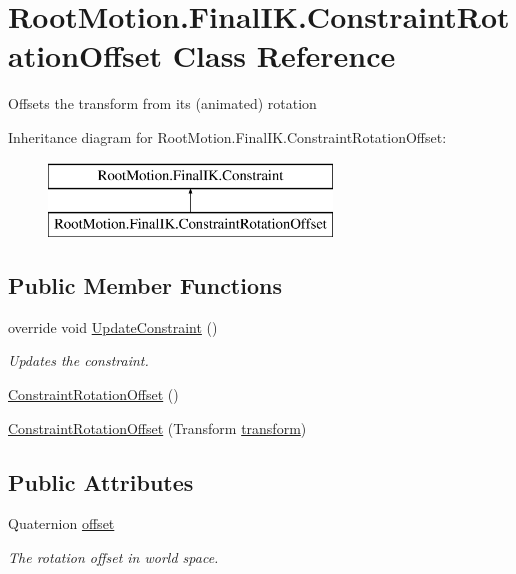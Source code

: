 \hypertarget{class_root_motion_1_1_final_i_k_1_1_constraint_rotation_offset}{}\section{Root\+Motion.\+Final\+I\+K.\+Constraint\+Rotation\+Offset Class Reference}
\label{class_root_motion_1_1_final_i_k_1_1_constraint_rotation_offset}


Offsets the transform from it\textquotesingle{}s (animated) rotation  


Inheritance diagram for Root\+Motion.\+Final\+I\+K.\+Constraint\+Rotation\+Offset\+:\begin{figure}[H]
\begin{center}
\leavevmode
\includegraphics[height=2.000000cm]{class_root_motion_1_1_final_i_k_1_1_constraint_rotation_offset}
\end{center}
\end{figure}
\subsection*{Public Member Functions}
\begin{DoxyCompactItemize}
\item 
override void \mbox{\hyperlink{class_root_motion_1_1_final_i_k_1_1_constraint_rotation_offset_a5116eea04782bf913c98dadb380cf8cc}{Update\+Constraint}} ()
\begin{DoxyCompactList}\small\item\em Updates the constraint. \end{DoxyCompactList}\item 
\mbox{\hyperlink{class_root_motion_1_1_final_i_k_1_1_constraint_rotation_offset_a6b30dae4b1f8d5375407cdca2241186b}{Constraint\+Rotation\+Offset}} ()
\item 
\mbox{\hyperlink{class_root_motion_1_1_final_i_k_1_1_constraint_rotation_offset_a856cd64855848ad57311fbc17fb38c95}{Constraint\+Rotation\+Offset}} (Transform \mbox{\hyperlink{class_root_motion_1_1_final_i_k_1_1_constraint_a2fe5a6e41ac6da0e5cb97a231696f937}{transform}})
\end{DoxyCompactItemize}
\subsection*{Public Attributes}
\begin{DoxyCompactItemize}
\item 
Quaternion \mbox{\hyperlink{class_root_motion_1_1_final_i_k_1_1_constraint_rotation_offset_a83777f35fc333d6d02c1b4a17e057112}{offset}}
\begin{DoxyCompactList}\small\item\em The rotation offset in world space. \end{DoxyCompactList}\end{DoxyCompactItemize}
